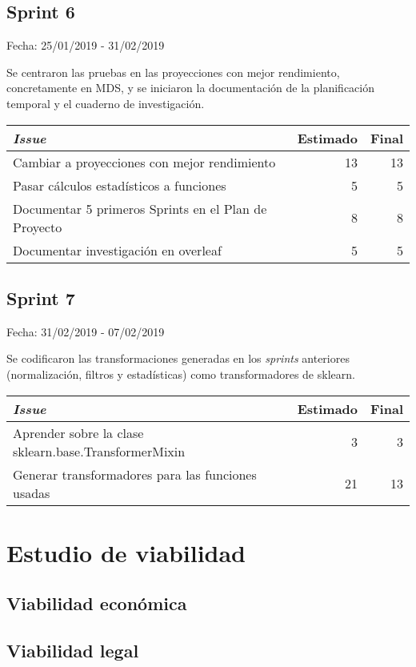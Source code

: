 \subsection{Sprint 6}

Fecha: 25/01/2019 - 31/02/2019

Se centraron las pruebas en las proyecciones con mejor rendimiento, concretamente en MDS, y se iniciaron la documentación de la planificación temporal y el cuaderno de investigación. 

\begin{table}[h]
	\begin{tabularx}{\textwidth}{|Xrr|}
		\hline \textbf{\textit{Issue}} & \textbf{Estimado} & \textbf{Final}\\
		\hline Cambiar a proyecciones con mejor rendimiento & 13 & 13 \\
		\hline Pasar cálculos estadísticos a funciones & 5 & 5 \\
		\hline Documentar 5 primeros Sprints en el Plan de Proyecto & 8 & 8 \\
		\hline Documentar investigación en overleaf & 5 & 5 \\
		\hline
	\end{tabularx}
\end{table}

\subsection{Sprint 7}

Fecha: 31/02/2019 - 07/02/2019

Se codificaron las transformaciones generadas en los \textit{sprints} anteriores (normalización, filtros y estadísticas) como transformadores de sklearn.

\begin{table}[h]
	\begin{tabularx}{\textwidth}{|Xrr|}
		\hline \textbf{\textit{Issue}} & \textbf{Estimado} & \textbf{Final}\\
		\hline Aprender sobre la clase sklearn.base.TransformerMixin & 3 & 3 \\
		\hline Generar transformadores para las funciones usadas & 21 & 13 \\
		\hline
	\end{tabularx}
\end{table}

\section{Estudio de viabilidad}

\subsection{Viabilidad económica}

\subsection{Viabilidad legal}


